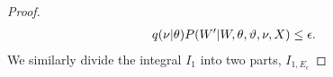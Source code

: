 \begin{proof}
\begin{align*}
  q(\nu | \theta) P(W' | W, \theta, \vartheta, \nu, X) \le \epsilon.
\end{align*}
We similarly divide the integral $I_1$ into two parts, $I_{1,E_\epsilon}$ 

\end{proof}
